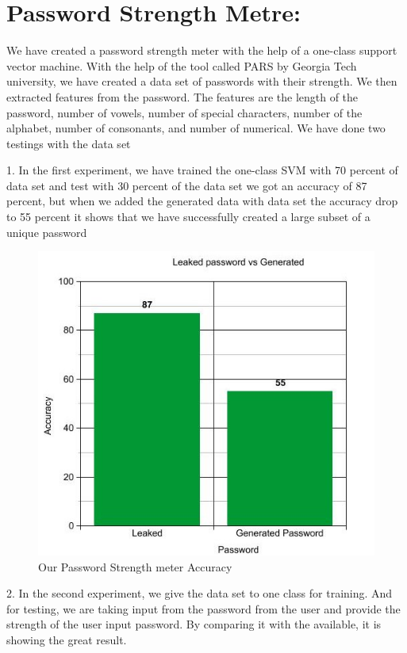 \documentclass[runningheads]{llncs}
\begin{document}
\section{Password Strength Metre:}
{We have created a password strength meter with the help of a one-class support vector machine. With the help of the tool called PARS by Georgia Tech university, we have created a data set of passwords with their strength. We then extracted features from the password. The features are the length of the password, number of vowels, number of special characters, number of the alphabet, number of consonants, and number of numerical. We have done two testings with the data set \par 1. In the first experiment, we have trained the one-class SVM with 70 percent of data set and test with 30 percent of the data set we got an accuracy of 87 percent, but when we added the generated data with data set the accuracy drop to 55 percent it shows that we have successfully created a large subset of a unique password
\par
\begin{figure}
  \centering
\begin{minipage}[b]{0.8\textwidth}
  \begin{mdframed}
    \includegraphics[width=\textwidth]{graph.jpg}
    \end{mdframed}
    \caption{Our Password Strength meter Accuracy}
  \end{minipage}
\end{figure}
\hfill
\par
2. In the second experiment, we give the data set to one class for training. And for testing, we are taking input from the password from the user and provide the strength of the user input password. By comparing it with the available, it is showing the great result.

}
\end{document}

